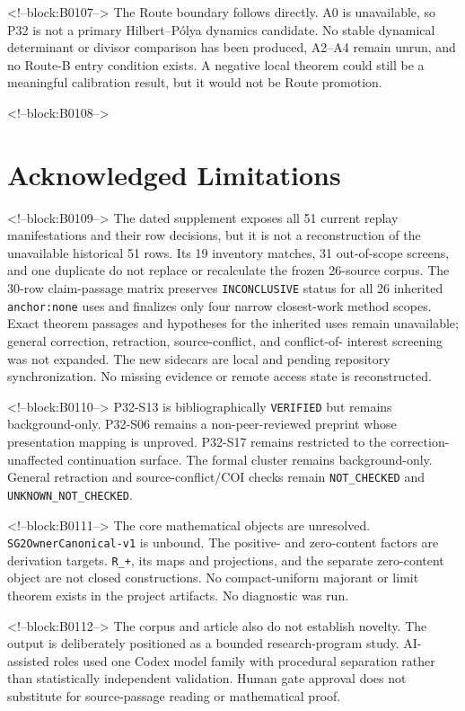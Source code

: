 \documentclass[11pt]{article}
\begin{document}
<!--block:B0107-->
The Route boundary follows directly. A0 is unavailable, so P32 is not a
primary Hilbert--Pólya dynamics candidate. No stable dynamical
determinant or divisor comparison has been produced, A2--A4 remain
unrun, and no Route-B entry condition exists. A negative local theorem
could still be a meaningful calibration result, but it would not be
Route promotion.

<!--block:B0108-->
\hypertarget{8-acknowledged-limitations}{%
\section{Acknowledged
Limitations}\label{8-acknowledged-limitations}}

<!--block:B0109-->
The dated supplement exposes all 51 current replay manifestations and
their row decisions, but it is not a reconstruction of the unavailable
historical 51 rows.  Its 19 inventory matches, 31 out-of-scope screens, and one
duplicate do not replace or recalculate the frozen 26-source corpus.  The 30-row
claim-passage matrix preserves \texttt{INCONCLUSIVE} status for all 26 inherited
\texttt{anchor:none} uses and finalizes only four narrow closest-work method
scopes.  Exact theorem passages and hypotheses for the inherited uses remain
unavailable; general correction, retraction, source-conflict, and conflict-of-
interest screening was not expanded.  The new sidecars are local and pending
repository synchronization.  No missing evidence or remote access state is
reconstructed.

<!--block:B0110-->
P32-S13 is bibliographically \texttt{VERIFIED} but remains background-only. P32-S06 remains
a non-peer-reviewed preprint whose presentation mapping is unproved.
P32-S17 remains restricted to the correction-unaffected continuation
surface. The formal cluster remains background-only. General retraction
and source-conflict/COI checks remain \texttt{NOT\_CHECKED} and
\texttt{UNKNOWN\_NOT\_CHECKED}.

<!--block:B0111-->
The core mathematical objects are unresolved.
\texttt{SG2OwnerCanonical-v1} is unbound. The positive- and zero-content
factors are derivation targets. \texttt{R\_+}, its maps and projections,
and the separate zero-content object are not closed constructions. No
compact-uniform majorant or limit theorem exists in the project
artifacts. No diagnostic was run.

<!--block:B0112-->
The corpus and article also do not establish novelty. The output is
deliberately positioned as a bounded research-program study.
AI-assisted roles used one Codex model family with procedural separation
rather than statistically independent validation. Human gate approval
does not substitute for source-passage reading or mathematical proof.
\end{document}
